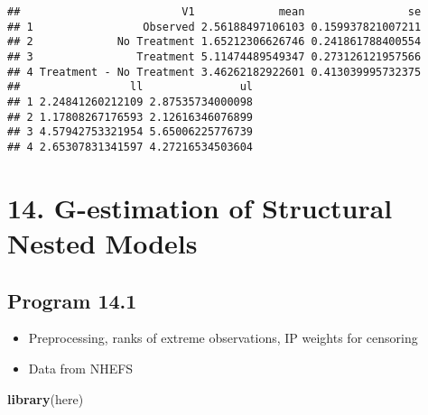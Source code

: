 \documentclass[10pt,]{book}
\newenvironment{Shaded}{\begin{snugshade}}{\end{snugshade}}
\newcommand{\CommentTok}[1]{\textcolor[rgb]{0.56,0.35,0.01}{\textit{#1}}}
\newcommand{\DecValTok}[1]{\textcolor[rgb]{0.00,0.00,0.81}{#1}}
\newcommand{\KeywordTok}[1]{\textcolor[rgb]{0.13,0.29,0.53}{\textbf{#1}}}
\newcommand{\NormalTok}[1]{#1}
\newcommand{\OperatorTok}[1]{\textcolor[rgb]{0.81,0.36,0.00}{\textbf{#1}}}
\newcommand{\StringTok}[1]{\textcolor[rgb]{0.31,0.60,0.02}{#1}}
\providecommand{\tightlist}{%
  \setlength{\itemsep}{0pt}\setlength{\parskip}{0pt}}
\begin{document}
\begin{verbatim}
##                         V1             mean                se
## 1                 Observed 2.56188497106103 0.159937821007211
## 2             No Treatment 1.65212306626746 0.241861788400554
## 3                Treatment 5.11474489549347 0.273126121957566
## 4 Treatment - No Treatment 3.46262182922601 0.413039995732375
##                 ll               ul
## 1 2.24841260212109 2.87535734000098
## 2 1.17808267176593 2.12616346076899
## 3 4.57942753321954 5.65006225776739
## 4 2.65307831341597 4.27216534503604
\end{verbatim}

\hypertarget{g-estimation-of-structural-nested-models}{%
\chapter*{14. G-estimation of Structural Nested Models}\label{g-estimation-of-structural-nested-models}}

\hypertarget{program-14.1}{%
\section{Program 14.1}\label{program-14.1}}

\begin{itemize}
\tightlist
\item
  Preprocessing, ranks of extreme observations, IP weights for censoring
\item
  Data from NHEFS
\end{itemize}

\begin{Shaded}
\begin{Highlighting}[]
\KeywordTok{library}\NormalTok{(here)}
\end{Highlighting}
\end{Shaded}

\begin{Shaded}
\end{Shaded}
\end{document}

